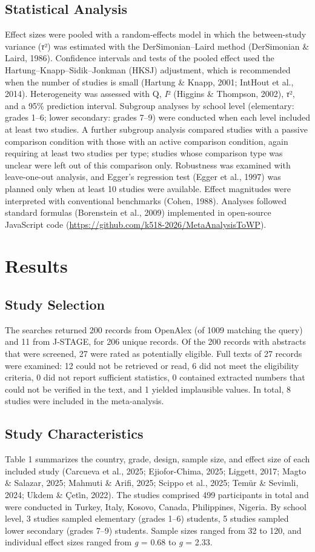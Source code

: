 \documentclass[man,a4paper,12pt,floatsintext,nolmodern,notab]{apa7}
\begin{document}
\subsection{Statistical Analysis}
Effect sizes were pooled with a random-effects model in which the between-study variance (\textit{τ}²) was estimated with the DerSimonian–Laird method (DerSimonian \& Laird, 1986). Confidence intervals and tests of the pooled effect used the Hartung–Knapp–Sidik–Jonkman (HKSJ) adjustment, which is recommended when the number of studies is small (Hartung \& Knapp, 2001; IntHout et al., 2014). Heterogeneity was assessed with Q, \textit{I}² (Higgins \& Thompson, 2002), \textit{τ}², and a 95\% prediction interval. Subgroup analyses by school level (elementary: grades 1–6; lower secondary: grades 7–9) were conducted when each level included at least two studies. A further subgroup analysis compared studies with a passive comparison condition with those with an active comparison condition, again requiring at least two studies per type; studies whose comparison type was unclear were left out of this comparison only. Robustness was examined with leave-one-out analysis, and Egger’s regression test (Egger et al., 1997) was planned only when at least 10 studies were available. Effect magnitudes were interpreted with conventional benchmarks (Cohen, 1988). Analyses followed standard formulas (Borenstein et al., 2009) implemented in open-source JavaScript code (\url{https://github.com/k518-2026/MetaAnalysisToWP}).

\section{Results}
\subsection{Study Selection}
The searches returned 200 records from OpenAlex (of 1009 matching the query) and 11 from J-STAGE, for 206 unique records. Of the 200 records with abstracts that were screened, 27 were rated as potentially eligible. Full texts of 27 records were examined: 12 could not be retrieved or read, 6 did not meet the eligibility criteria, 0 did not report sufficient statistics, 0 contained extracted numbers that could not be verified in the text, and 1 yielded implausible values. In total, 8 studies were included in the meta-analysis.

\subsection{Study Characteristics}
Table 1 summarizes the country, grade, design, sample size, and effect size of each included study (Carcueva et al., 2025; Ejiofor-Chima, 2025; Liggett, 2017; Magto \& Salazar, 2025; Mahmuti \& Arifi, 2025; Scippo et al., 2025; Temür \& Sevimli, 2024; Ukdem \& Çeti̇n, 2022). The studies comprised 499 participants in total and were conducted in Turkey, Italy, Kosovo, Canada, Philippines, Nigeria. By school level, 3 studies sampled elementary (grades 1–6) students, 5 studies sampled lower secondary (grades 7–9) students. Sample sizes ranged from 32 to 120, and individual effect sizes ranged from \textit{g} = 0.68 to \textit{g} = 2.33.
\end{document}
